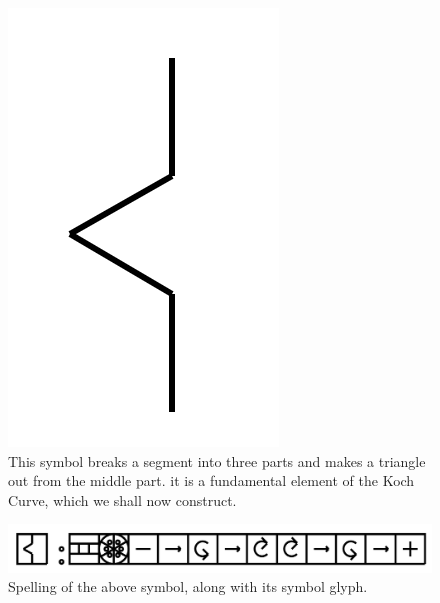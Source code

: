 \documentclass[11pt]{book}
\begin{document}
\begin{figure}

\includegraphics[width=\linewidth]{../figures/koch0.png}

\caption{This symbol breaks a segment into three parts and makes a triangle out from the middle part. it is a fundamental element of the Koch Curve, which we shall now construct.}
\end{figure}


\begin{figure}

\includegraphics[width=\linewidth]{../figures/koch1.png}

\caption{Spelling of the above symbol, along with its symbol glyph.}
\end{figure}
\end{document}
